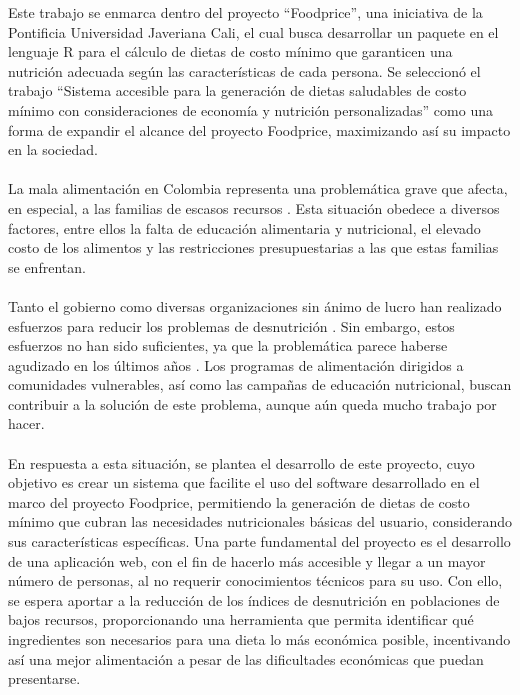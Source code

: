 
\noindent Este trabajo se enmarca dentro del proyecto ``Foodprice'', una iniciativa de la Pontificia Universidad Javeriana Cali, el cual busca desarrollar un paquete en el lenguaje R para el c\'alculo de dietas de costo m\'inimo que garanticen una nutrici\'on adecuada seg\'un las caracter\'isticas de cada persona. Se seleccion\'o el trabajo ``Sistema accesible para la generaci\'on de dietas saludables de costo m\'inimo con consideraciones de econom\'ia y nutrici\'on personalizadas'' como una forma de expandir el alcance del proyecto Foodprice, maximizando as\'i su impacto en la sociedad.
\\
\\
\noindent La mala alimentaci\'on en Colombia representa una problem\'atica grave que afecta, en especial, a las familias de escasos recursos \cite{sarmientoDesnutricionColombiaDesde}. Esta situaci\'on obedece a diversos factores, entre ellos la falta de educaci\'on alimentaria y nutricional, el elevado costo de los alimentos y las restricciones presupuestarias a las que estas familias se enfrentan.
\\
\\
\noindent Tanto el gobierno como diversas organizaciones sin \'animo de lucro han realizado esfuerzos para reducir los problemas de desnutrici\'on \cite{HambreCeroAgenda}. Sin embargo, estos esfuerzos no han sido suficientes, ya que la problem\'atica parece haberse agudizado en los \'ultimos a\~{n}os \cite{aumentoDesnutricion}. Los programas de alimentaci\'on dirigidos a comunidades vulnerables, as\'i como las campa\~{n}as de educaci\'on nutricional, buscan contribuir a la soluci\'on de este problema, aunque a\'un queda mucho trabajo por hacer.
\\
\\
\noindent En respuesta a esta situaci\'on, se plantea el desarrollo de este proyecto, cuyo objetivo es crear un sistema que facilite el uso del software desarrollado en el marco del proyecto Foodprice, permitiendo la generaci\'on de dietas de costo m\'inimo que cubran las necesidades nutricionales b\'asicas del usuario, considerando sus caracter\'isticas espec\'ificas. Una parte fundamental del proyecto es el desarrollo de una aplicaci\'on web, con el fin de hacerlo m\'as accesible y llegar a un mayor n\'umero de personas, al no requerir conocimientos t\'ecnicos para su uso. Con ello, se espera aportar a la reducci\'on de los \'indices de desnutrici\'on en poblaciones de bajos recursos, proporcionando una herramienta que permita identificar qu\'e ingredientes son necesarios para una dieta lo m\'as econ\'omica posible, incentivando as\'i una mejor alimentaci\'on a pesar de las dificultades econ\'omicas que puedan presentarse.

